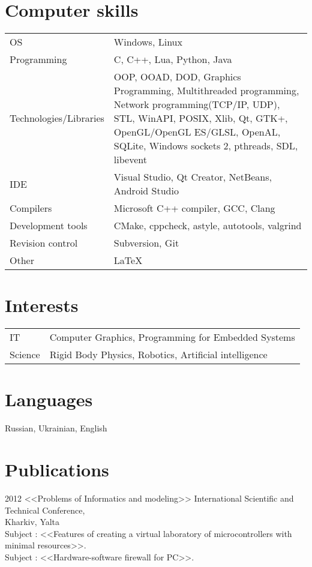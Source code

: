 \documentclass[12pt,a4paper]{article}
\begin{document}
\section*{Computer skills}
\begin{tabular}{p{4cm} p{12cm}}
OS & Windows, Linux\\
Programming & C, C++, Lua, Python, Java\\
Technologies/Libraries & OOP, OOAD, DOD, Graphics Programming, Multithreaded programming, Network programming(TCP/IP, UDP), STL, WinAPI, POSIX, Xlib, Qt, GTK+, OpenGL/OpenGL ES/GLSL, OpenAL, SQLite, Windows sockets 2, pthreads, SDL, libevent\\
IDE & Visual Studio, Qt Creator, NetBeans, Android Studio\\
Compilers & Microsoft C++ compiler, GCC, Clang\\
Development tools & CMake, cppcheck, astyle, autotools, valgrind\\
Revision control & Subversion, Git\\
Other & LaTeX\\
\end{tabular}
\section*{Interests}
\begin{tabular}{p{4cm} p{12cm}}
IT & Computer Graphics, Programming for Embedded Systems\\
Science & Rigid Body Physics, Robotics, Artificial intelligence\\
\end{tabular}
\section*{Languages}
Russian, Ukrainian, English
\section*{Publications}
2012 <<Problems of Informatics and modeling>> International Scientific and Technical Conference,\\ Kharkiv, Yalta\\
Subject : <<Features of creating a virtual laboratory of microcontrollers with minimal resources>>.\\
Subject : <<Hardware-software firewall for PC>>.
\end{document}
